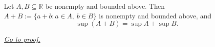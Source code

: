 \begin{theorem}
\label{thm:supremum-sum-set}
Let $A,B\subseteq\mathbb{R}$ be nonempty and bounded above.  Then
$A+B:=\{a+b:a\in A,\ b\in B\}$ is nonempty and bounded above, and
\[
  \sup(A+B)=\sup A+\sup B.
\]

\smallskip
\noindent
\hyperref[prf:supremum-sum-set]{\textit{Go to proof.}}
\end{theorem}
